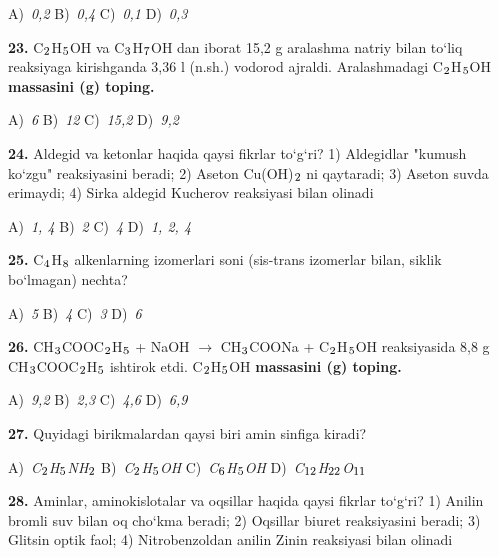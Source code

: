 \documentclass[11pt,a4paper]{article}
\renewcommand{\textsubscript}[1]{\ensuremath{_{\text{\fontsize{8}{8}\selectfont #1}}}}
\begin{document}
\begin{multicols}{2}
\noindent A)~\textsl{0,2} \hfill B)~\textsl{0,4} \hfill C)~\textsl{0,1} \hfill D)~\textsl{0,3}\par
\vspace{4pt}
\noindent\textbf{23.} C\textsubscript{2}H\textsubscript{5}OH va C\textsubscript{3}H\textsubscript{7}OH dan iborat 15,2 g aralashma natriy bilan to`liq reaksiyaga kirishganda 3,36 l (n.sh.) vodorod ajraldi. Aralashmadagi C\textsubscript{2}H\textsubscript{5}OH \textbf{massasini (g) toping.}

\noindent A)~\textsl{6} \hfill B)~\textsl{12} \hfill C)~\textsl{15,2} \hfill D)~\textsl{9,2}\par
\vspace{4pt}
\noindent\textbf{24.} Aldegid va ketonlar haqida qaysi fikrlar to`g`ri? 1) Aldegidlar "kumush ko`zgu" reaksiyasini beradi; 2) Aseton Cu(OH)\textsubscript{2} ni qaytaradi; 3) Aseton suvda erimaydi; 4) Sirka aldegid Kucherov reaksiyasi bilan olinadi

\noindent A)~\textsl{1, 4} \hfill B)~\textsl{2} \hfill C)~\textsl{4} \hfill D)~\textsl{1, 2, 4}\par
\vspace{4pt}
\noindent\textbf{25.} C\textsubscript{4}H\textsubscript{8} alkenlarning izomerlari soni (sis-trans izomerlar bilan, siklik bo`lmagan) nechta?

\noindent A)~\textsl{5} \hfill B)~\textsl{4} \hfill C)~\textsl{3} \hfill D)~\textsl{6}\par
\vspace{4pt}
\noindent\textbf{26.} CH\textsubscript{3}COOC\textsubscript{2}H\textsubscript{5} + NaOH $\to$ CH\textsubscript{3}COONa + C\textsubscript{2}H\textsubscript{5}OH reaksiyasida 8,8 g CH\textsubscript{3}COOC\textsubscript{2}H\textsubscript{5} ishtirok etdi. C\textsubscript{2}H\textsubscript{5}OH \textbf{massasini (g) toping.}

\noindent A)~\textsl{9,2} \hfill B)~\textsl{2,3} \hfill C)~\textsl{4,6} \hfill D)~\textsl{6,9}\par
\vspace{4pt}
\noindent\textbf{27.} Quyidagi birikmalardan qaysi biri amin sinfiga kiradi?

\noindent A)~\textsl{C\textsubscript{2}H\textsubscript{5}NH\textsubscript{2}} \hfill B)~\textsl{C\textsubscript{2}H\textsubscript{5}OH} \hfill C)~\textsl{C\textsubscript{6}H\textsubscript{5}OH} \hfill D)~\textsl{C\textsubscript{12}H\textsubscript{22}O\textsubscript{11}}\par
\vspace{4pt}
\noindent\textbf{28.} Aminlar, aminokislotalar va oqsillar haqida qaysi fikrlar to`g`ri? 1) Anilin bromli suv bilan oq cho`kma beradi; 2) Oqsillar biuret reaksiyasini beradi; 3) Glitsin optik faol; 4) Nitrobenzoldan anilin Zinin reaksiyasi bilan olinadi


\end{multicols}
\end{document}
